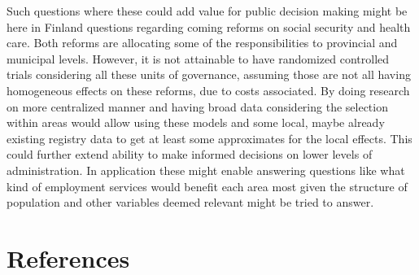 \documentclass[main=english,12pt,a4paper,pdftex,econ,utf8]{aaltothesis}
\begin{document}
Such questions where these could add value for public decision making might be here in Finland questions regarding coming reforms on social security and health care. Both reforms are allocating some of the responsibilities to provincial and municipal levels. However, it is not attainable to have randomized controlled trials considering all these units of governance, assuming those are not all having homogeneous effects on these reforms, due to costs associated. By doing research on more centralized manner and having broad data considering the selection within areas would allow using these models and some local, maybe already existing registry data to get at least some approximates for the local effects. This could further extend ability to make informed decisions on lower levels of administration. In application these might enable answering questions like what kind of employment services would benefit each area most given the structure of population and other variables deemed relevant might be tried to answer.

\clearpage

\section*{References}
\printbibliography[
    heading=subbibintoc,
    type=article,
    title={Articles \& seminar papers}
]
\printbibliography[
    heading=subbibintoc,
    type=book,
    title={Books}
]
\printbibliography[
    heading=subbibintoc,
    type=misc,
    title={Other sources}
]

\clearpage
\end{document}
